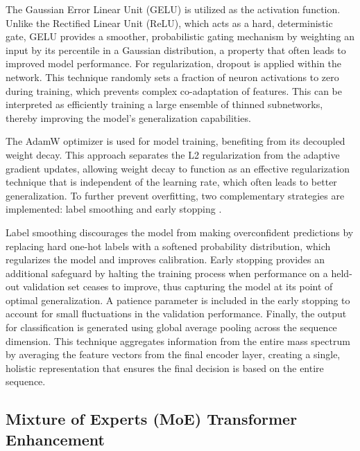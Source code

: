The Gaussian Error Linear Unit (GELU) \citep{Hendrycks2016} is utilized as the activation function. Unlike the Rectified Linear Unit (ReLU), which acts as a hard, deterministic gate, GELU provides a smoother, probabilistic gating mechanism by weighting an input by its percentile in a Gaussian distribution, a property that often leads to improved model performance. For regularization, dropout \citep{Srivastava2014} is applied within the network. This technique randomly sets a fraction of neuron activations to zero during training, which prevents complex co-adaptation of features. This can be interpreted as efficiently training a large ensemble of thinned subnetworks, thereby improving the model's generalization capabilities.

The AdamW optimizer \citep{Loshchilov2017} is used for model training, benefiting from its decoupled weight decay. This approach separates the L2 regularization from the adaptive gradient updates, allowing weight decay to function as an effective regularization technique that is independent of the learning rate, which often leads to better generalization. To further prevent overfitting, two complementary strategies are implemented: label smoothing \citep{Szegedy2016} and early stopping \citep{Morgan1989,Goodfellow2016}. 

Label smoothing discourages the model from making overconfident predictions by replacing hard one-hot labels with a softened probability distribution, which regularizes the model and improves calibration. 
Early stopping provides an additional safeguard by halting the training process when performance on a held-out validation set ceases to improve, thus capturing the model at its point of optimal generalization.
A patience parameter is included in the early stopping to account for small fluctuations in the validation performance.
Finally, the output for classification is generated using global average pooling across the sequence dimension. This technique aggregates information from the entire mass spectrum by averaging the feature vectors from the final encoder layer, creating a single, holistic representation that ensures the final decision is based on the entire sequence.

\subsection{Mixture of Experts (MoE) Transformer Enhancement}

